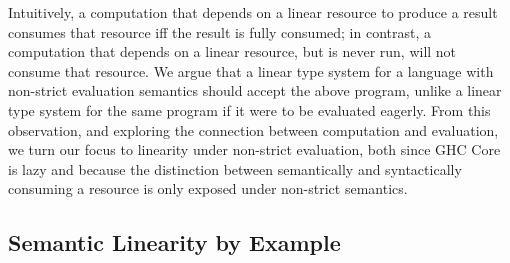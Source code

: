 \documentclass[acmsmall,review,anonymous,screen]{acmart}
\begin{document}
%
Intuitively, a computation that depends on a linear resource to produce a
result consumes that resource iff the result is fully consumed; in
contrast, a computation that depends on a linear resource, but is never run,
will not consume that resource.
%
We argue that a linear type system for a language with non-strict evaluation
semantics should accept the above program, unlike a linear type system for the
same program if it were to be evaluated eagerly.
%
From this observation, and exploring the connection between computation and evaluation,
%
we turn our focus to linearity under non-strict evaluation, both since GHC Core is
lazy and because the distinction between semantically and syntactically
consuming a resource is only exposed under non-strict semantics.
%

% 
% 
% 

\subsection{Semantic Linearity by Example\label{sec:semantic-linearity-examples}}
\end{document}
